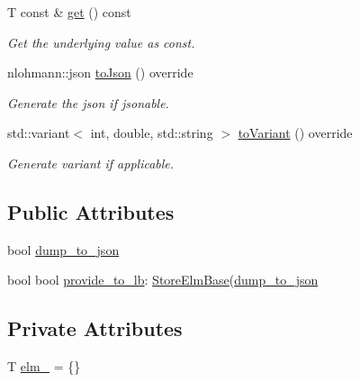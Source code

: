 \begin{DoxyCompactItemize}
T const  \& \hyperlink{structvt_1_1vrt_1_1collection_1_1storage_1_1_store_elm_3_01_t_00_01typename_01std_1_1enable__if_947e0655769addb625fb511f777768bd_afd8bb1f887dfb0a9d165693b1c7040ae}{get} () const
\begin{DoxyCompactList}\small\item\em Get the underlying value as const. \end{DoxyCompactList}\item 
nlohmann\+::json \hyperlink{structvt_1_1vrt_1_1collection_1_1storage_1_1_store_elm_3_01_t_00_01typename_01std_1_1enable__if_947e0655769addb625fb511f777768bd_aea4bf3c797fb58b2e53fcbf6010c31d1}{to\+Json} () override
\begin{DoxyCompactList}\small\item\em Generate the json if jsonable. \end{DoxyCompactList}\item 
std\+::variant$<$ int, double, std\+::string $>$ \hyperlink{structvt_1_1vrt_1_1collection_1_1storage_1_1_store_elm_3_01_t_00_01typename_01std_1_1enable__if_947e0655769addb625fb511f777768bd_a7eea2c008b62018472a0b5f544320788}{to\+Variant} () override
\begin{DoxyCompactList}\small\item\em Generate variant if applicable. \end{DoxyCompactList}\end{DoxyCompactItemize}
\subsection*{Public Attributes}
\begin{DoxyCompactItemize}
\item 
bool \hyperlink{structvt_1_1vrt_1_1collection_1_1storage_1_1_store_elm_3_01_t_00_01typename_01std_1_1enable__if_947e0655769addb625fb511f777768bd_aad3ecc5effe2f7965a083da05ffa4c5f}{dump\+\_\+to\+\_\+json}
\item 
bool bool \hyperlink{structvt_1_1vrt_1_1collection_1_1storage_1_1_store_elm_3_01_t_00_01typename_01std_1_1enable__if_947e0655769addb625fb511f777768bd_a97c2111aad25f504ad9e1fd0744d8700}{provide\+\_\+to\+\_\+lb}\+: \hyperlink{structvt_1_1vrt_1_1collection_1_1storage_1_1_store_elm_base}{Store\+Elm\+Base}(\hyperlink{structvt_1_1vrt_1_1collection_1_1storage_1_1_store_elm_3_01_t_00_01typename_01std_1_1enable__if_947e0655769addb625fb511f777768bd_aad3ecc5effe2f7965a083da05ffa4c5f}{dump\+\_\+to\+\_\+json}
\end{DoxyCompactItemize}
\subsection*{Private Attributes}
\begin{DoxyCompactItemize}
\item 
T \hyperlink{structvt_1_1vrt_1_1collection_1_1storage_1_1_store_elm_3_01_t_00_01typename_01std_1_1enable__if_947e0655769addb625fb511f777768bd_ad2f7d3b8c3c4358d7e2c352721aaa717}{elm\+\_\+} = \{\}
\end{DoxyCompactItemize}
